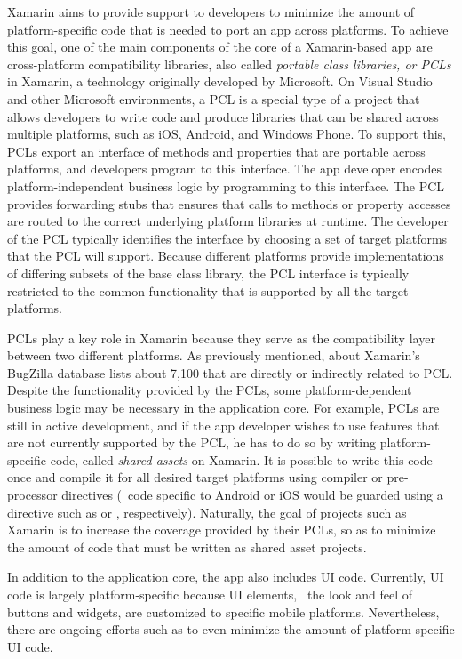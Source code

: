 Xamarin aims to provide support to developers to minimize the amount of
platform-specific code that is needed to port an app across platforms.  To
achieve this goal, one of the main components of the core of a Xamarin-based
app are cross-platform compatibility libraries, also called \textit{portable
class libraries, or PCLs} in Xamarin, a technology originally developed by
Microsoft. On Visual Studio and other Microsoft environments, a PCL is a
special type of a project that allows developers to write code and produce
libraries that can be shared across multiple platforms, such as iOS, Android,
and Windows Phone. To support this, PCLs export an interface of methods and
properties that are portable across platforms, and developers program to this
interface. The app developer encodes platform-independent business logic by
programming to this interface. The PCL provides forwarding stubs that ensures
that calls to methods or property accesses are routed to the correct underlying
platform libraries at runtime.  The developer of the PCL typically identifies
the interface by choosing a set of target platforms that the PCL will support.
Because different platforms provide implementations of differing subsets of the
base  class library, the PCL interface is typically restricted to
the common  functionality that is supported by all the target
platforms. 

PCLs play a key role in Xamarin because they serve as the compatibility layer
between two different platforms. As previously mentioned, about Xamarin's
BugZilla database lists about 7,100 that are directly or indirectly related to
PCL.  Despite the functionality provided by the PCLs, some platform-dependent
business logic may be necessary in the application core.  For example, PCLs are
still in active development, and if the app developer wishes to use features
that are not currently supported by the PCL, he has to do so by writing
platform-specific code, called \textit{shared assets} on Xamarin. It is
possible to write this code once and compile it for all desired target
platforms using compiler or pre-processor directives (\eg~code specific to
Android or iOS would be guarded using a directive such as  or , respectively).  Naturally, the goal of projects
such as Xamarin is to increase the coverage provided by their PCLs, so as to
minimize the amount of code that must be written as shared asset projects.

In addition to the application core, the app also includes UI code. Currently,
UI code is largely platform-specific because UI elements, \eg~the look and feel
of buttons and widgets, are customized to specific mobile platforms.
Nevertheless, there are ongoing efforts such as  to even
minimize the amount of platform-specific UI code.

